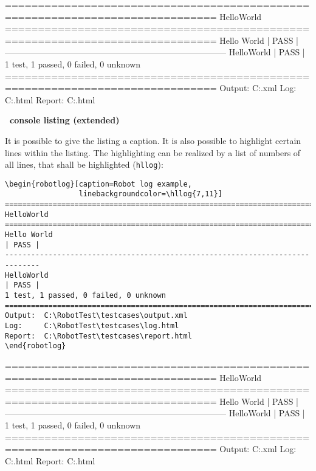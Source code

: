 \documentclass[a4paper,10pt]{report}
\begin{document}
\vspace{2ex}

\begin{robotlog}
==============================================================================
HelloWorld
==============================================================================
Hello World                                                           | PASS |
------------------------------------------------------------------------------
HelloWorld                                                            | PASS |
1 test, 1 passed, 0 failed, 0 unknown
==============================================================================
Output:  C:\RobotTest\testcases\output.xml
Log:     C:\RobotTest\testcases\log.html
Report:  C:\RobotTest\testcases\report.html
\end{robotlog}

\vspace{2ex}

\textbf{\rfw\ console listing (extended)}

It is possible to give the listing a caption. It is also possible to highlight certain lines within the listing. The highlighting can be realized by a list
of numbers of all lines, that shall be highlighted (\texttt{hllog}):

\vspace{2ex}

\begin{verbatim}
\begin{robotlog}[caption=Robot log example, 
                 linebackgroundcolor=\hllog{7,11}]
==============================================================================
HelloWorld
==============================================================================
Hello World                                                           | PASS |
------------------------------------------------------------------------------
HelloWorld                                                            | PASS |
1 test, 1 passed, 0 failed, 0 unknown
==============================================================================
Output:  C:\RobotTest\testcases\output.xml
Log:     C:\RobotTest\testcases\log.html
Report:  C:\RobotTest\testcases\report.html
\end{robotlog}
\end{verbatim}

\newpage

\begin{robotlog}[caption=Robot log example, 
                 linebackgroundcolor=\hllog{7,11}]
==============================================================================
HelloWorld
==============================================================================
Hello World                                                           | PASS |
------------------------------------------------------------------------------
HelloWorld                                                            | PASS |
1 test, 1 passed, 0 failed, 0 unknown
==============================================================================
Output:  C:\RobotTest\testcases\output.xml
Log:     C:\RobotTest\testcases\log.html
Report:  C:\RobotTest\testcases\report.html
\end{robotlog}
\end{document}
